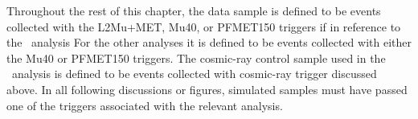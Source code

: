 Throughout the rest of this chapter, the data sample is defined to be events collected with the L2Mu+MET, Mu40, or PFMET150 triggers if in reference to the \muononly\ analysis
For the other analyses it is defined to be events collected with either the Mu40 or PFMET150 triggers. The cosmic-ray control sample used in the \muononly\ analysis
is defined to be events collected with cosmic-ray trigger discussed above. In all following discussions or figures, simulated samples must have passed one of the triggers
associated with the relevant analysis.